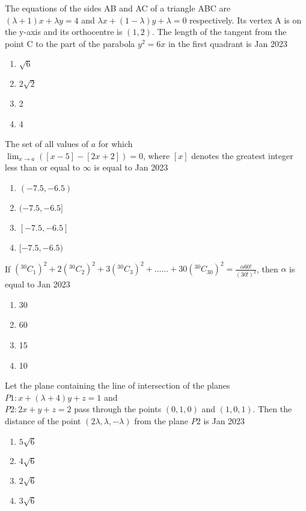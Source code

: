 \item The equations of the sides AB and AC of a triangle
ABC are \\
$(\lambda + 1) x + \lambda y = 4 $ and $ \lambda x + (1-\lambda) y + \lambda = 0$
 respectively. Its vertex A is on the y-axis and its
orthocentre is $(1, 2)$. The length of the tangent
from the point C to the part of the parabola $y^{2}
 = 6x$
in the first quadrant is 
\hfill{Jan 2023}\begin{enumerate}
    \item $\sqrt{6}$
    \item $2\sqrt{2}$
    \item 2
    \item 4
\end{enumerate}
\item The set of all values of $a$ for which \\
$\lim_{x \to a} ([x-5]-[2x+2])=0$, where $[x]$ denotes the greatest integer less than or equal to $\infty$ is equal to 
\hfill{Jan 2023}\begin{enumerate}
    \item $(-7.5, -6.5)$
    \item $(-7.5, -6.5] $
    \item $[-7.5, -6.5] $
    \item $[-7.5, -6.5) $
\end{enumerate}
\item If $ ({}^{30}C_{1})^{2} + 2({}^{30}C_{2})^{2} + 3({}^{30}C_{3})^{2} +......+ 30({}^{30}C_{30})^{2} = \frac{\alpha60!}{(30!)^{2}} $, then $\alpha$ is equal to 
\hfill{Jan 2023}\begin{enumerate}
    \item 30
    \item 60
    \item 15
    \item 10
\end{enumerate}
\item Let the plane containing the line of intersection
of the planes \\
$P1: x + (\lambda + 4)y + z = 1$ and \\
$P2 : 2x + y + z = 2$ pass through the points $(0, 1, 0)$
and $(1, 0, 1)$. Then the distance of the point
$(2\lambda, \lambda, -\lambda)$ from the plane $P2$ is
\hfill{Jan 2023}\begin{enumerate}
    \item $ 5\sqrt{6}$
    \item $ 4\sqrt{6}$
    \item $ 2\sqrt{6}$
    \item $ 3\sqrt{6}$
\end{enumerate}
